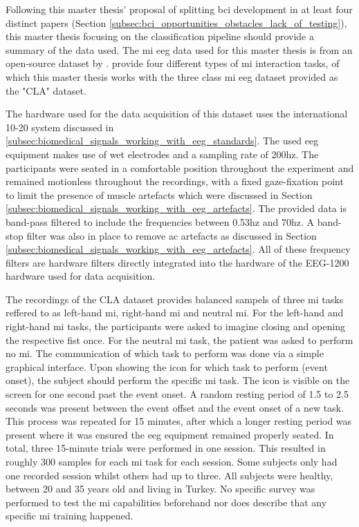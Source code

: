 Following this master thesis' proposal of splitting \gls{bci} development in at least four distinct papers (Section \ref{subsec:bci_opportunities_obstacles_lack_of_testing}), this master thesis focusing on the classification pipeline should provide a summary of the data used.
The \gls{mi} \gls{eeg} data used for this master thesis is from an open-source dataset by \citet{eeg_data}.
 provide four different types of \gls{mi} interaction tasks, of which this master thesis works with the three class \gls{mi} \gls{eeg} dataset provided as the "CLA" dataset.

The hardware used for the data acquisition of this dataset uses the international 10-20 system discussed in \ref{subsec:biomedical_signals_working_with_eeg_standards}.
The used \gls{eeg} equipment makes use of wet electrodes and a sampling rate of 200\gls{hz}.
The participants were seated in a comfortable position throughout the experiment and remained motionless throughout the recordings, with a fixed gaze-fixation point to limit the presence of muscle artefacts which were discussed in Section \ref{subsec:biomedical_signals_working_with_eeg_artefacts}.
The provided data is band-pass filtered to include the frequencies between 0.53\gls{hz} and 70\gls{hz}.
A band-stop filter was also in place to remove \gls{ac} artefacts as discussed in Section \ref{subsec:biomedical_signals_working_with_eeg_artefacts}.
All of these frequency filters are hardware filters directly integrated into the hardware of the EEG-1200 hardware used for data acquisition.

The recordings of the CLA dataset provides balanced sampels of three \gls{mi} tasks reffered to as left-hand \gls{mi}, right-hand \gls{mi} and neutral \gls{mi}.
For the left-hand and right-hand \gls{mi} tasks, the participants were asked to imagine closing and opening the respective fist once.
For the neutral \gls{mi} task, the patient was asked to perform no \gls{mi}.
The communication of which task to perform was done via a simple graphical interface.
Upon showing the icon for which task to perform (event onset), the subject should perform the specific \gls{mi} task.
The icon is visible on the screen for one second past the event onset.
A random resting period of 1.5 to 2.5 seconds was present between the event offset and the event onset of a new task.
This process was repeated for 15 minutes, after which a longer resting period was present where it was ensured the \gls{eeg} equipment remained properly seated.
In total, three 15-minute trials were performed in one session.
This resulted in roughly 300 samples for each \gls{mi} task for each session.
Some subjects only had one recorded session whilst others had up to three.
All subjects were healthy, between 20 and 35 years old and living in Turkey.
No specific survey was performed to test the \gls{mi} capabilities beforehand nor does \citet{eeg_data} describe that any specific \gls{mi} training happened.

